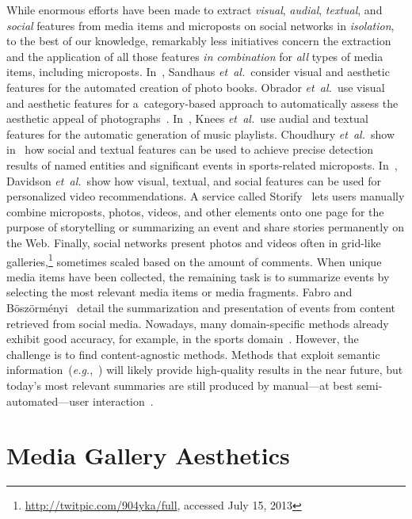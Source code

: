 While enormous efforts have been made to extract
\emph{visual}, \emph{audial},
\emph{textual}, and \emph{social} features
from media items and microposts on social networks in \emph{isolation},
to the best of our knowledge, remarkably less initiatives
concern the extraction and the application
of all those features \emph{in combination}
for \emph{all} types of media items, including microposts.
In~\cite{sandhaus2011photobook}, Sandhaus \emph{et~al.}\ consider visual and
aesthetic features for the automated creation of photo books.
Obrador \emph{et~al.}\ use visual and aesthetic features
for a~category-based approach to automatically assess
the aesthetic appeal of photographs~\cite{obrador2012photoaesthetics}.
In~\cite{knees2006musicplaylist}, Knees \emph{et~al.}\ use audial and textual
features for the automatic generation of music playlists.
Choudhury \emph{et~al.}\ show in~\cite{choudhury2011sportstweets} how social and textual
features can be used to achieve precise detection results
of named entities and significant events in sports-related microposts.
In~\cite{davidson2010videorecommendation}, Davidson \emph{et~al.}\ show how visual,
textual, and social features can be used for personalized video recommendations.
A service called Storify~\cite{fincham2011storify,atasoy2011storify} lets users manually combine
microposts, photos, videos, and other elements onto one page for the purpose
of storytelling or summarizing an event
and share stories permanently on the Web.
Finally, social networks present photos and videos
often in grid-like galleries,\footnote{\url{http://twitpic.com/904yka/full}, accessed July 15, 2013}
sometimes scaled based on the amount of comments.
When unique media items have been collected,
the remaining task is to summarize events by selecting the most relevant media items or media fragments.
Fabro and B\"osz\"orm\'enyi~\cite{delfabro2012summarization} detail
the summarization and presentation of events from content retrieved from social media.
Nowadays, many domain-specific methods already exhibit good accuracy,
for example, in the sports domain~\cite{li2001sportsvideo,li2010americanfootball}. However, the challenge is to find content-agnostic methods.
Methods that exploit semantic information~(\emph{e.g.},~\cite{chen2009videosummarization})
will likely provide high-quality results in the near future,
but today's most relevant summaries are still produced by
manual---at best semi-automated---user interaction~\cite{olsen2011videosummarization}.

\section{Media Gallery Aesthetics}

